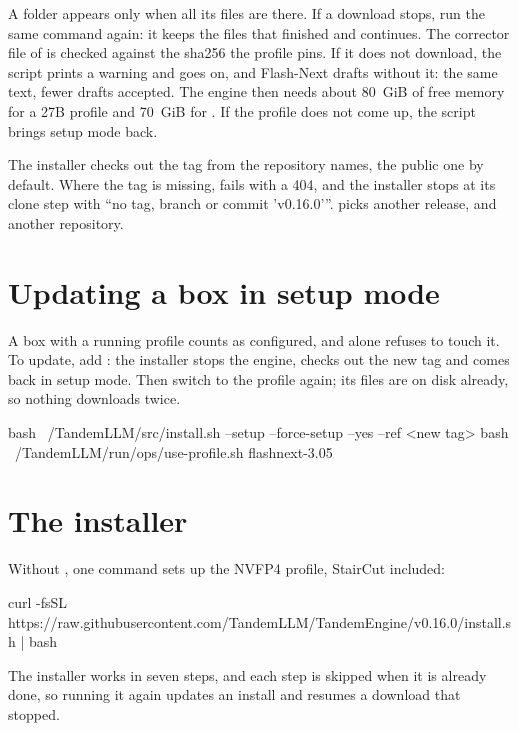 A folder appears only when all its files are there. If a download stops, run the same command again: it keeps the files that finished and continues. The corrector file of  is checked against the sha256 the profile pins. If it does not download, the script prints a warning and goes on, and Flash-Next drafts without it: the same text, fewer drafts accepted. The engine then needs about 80~GiB of free memory for a 27B profile and 70~GiB for . If the profile does not come up, the script brings setup mode back.

The installer checks out the tag  from the repository  names, the public one by default. Where the tag is missing,  fails with a 404, and the installer stops at its clone step with \enquote{no tag, branch or commit 'v0.16.0'}.  picks another release, and  another repository.

\section{Updating a box in setup mode}\label{sec:update-setup}

A box with a running profile counts as configured, and  alone refuses to touch it. To update, add : the installer stops the engine, checks out the new tag and comes back in setup mode. Then switch to the profile again; its files are on disk already, so nothing downloads twice.

\begin{shell}
bash ~/TandemLLM/src/install.sh --setup --force-setup --yes --ref <new tag>
bash ~/TandemLLM/run/ops/use-profile.sh flashnext-3.05
\end{shell}

\section{The installer}

Without , one command sets up the NVFP4 profile, StairCut included:

\begin{shell}
curl -fsSL https://raw.githubusercontent.com/TandemLLM/TandemEngine/v0.16.0/install.sh | bash
\end{shell}

The installer works in seven steps, and each step is skipped when it is already done, so running it again updates an install and resumes a download that stopped.

